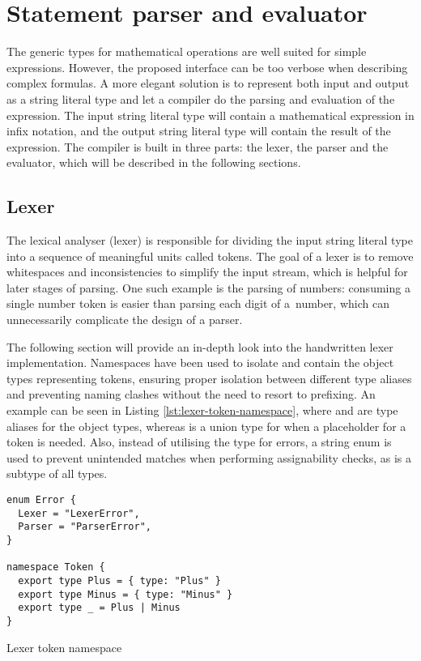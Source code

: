 

\section{Statement parser and evaluator}

The generic types for mathematical operations are well suited for simple expressions. However, the proposed interface can be too verbose when describing complex formulas. A more elegant solution is to represent both input and output as a string literal type and let a compiler do the parsing and evaluation of the expression. The input string literal type will contain a mathematical expression in infix notation, and the output string literal type will contain the result of the expression. The compiler is built in three parts: the lexer, the parser and the evaluator, which will be described in the following sections.

\subsection{Lexer}

The lexical analyser (lexer) is responsible for dividing the input string literal type into a sequence of meaningful units called tokens. The goal of a lexer is to remove whitespaces and inconsistencies to simplify the input stream, which is helpful for later stages of parsing. One such example is the parsing of numbers: consuming a single number token is easier than parsing each digit of a~number, which can unnecessarily complicate the design of a parser.

The following section will provide an in-depth look into the handwritten lexer implementation. Namespaces have been used to isolate and contain the object types representing tokens, ensuring proper isolation between different type aliases and preventing naming clashes without the need to resort to prefixing. An example can be seen in Listing \ref{lst:lexer-token-namespace}, where  and  are type aliases for the object types, whereas \vcode{_} is a union type for when a placeholder for a token is needed. Also, instead of utilising the  type for errors, a string enum is used to prevent unintended matches when performing assignability checks, as  is a subtype of all types.

\begin{listing}[ht]
  \begin{verbatim}
enum Error {
  Lexer = "LexerError",
  Parser = "ParserError",
}

namespace Token {
  export type Plus = { type: "Plus" } 
  export type Minus = { type: "Minus" } 
  export type _ = Plus | Minus
} 
\end{verbatim}
  \caption{Lexer token namespace}\label{lst:lexer-token-namespace}
\end{listing}

